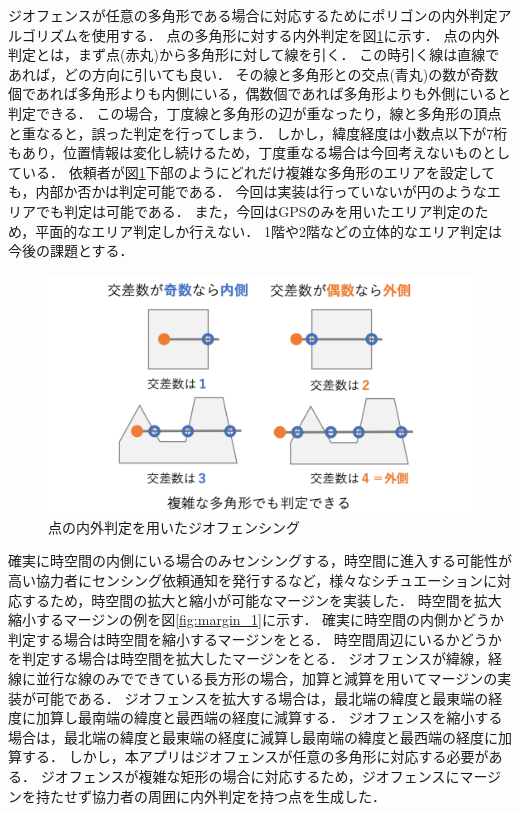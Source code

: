 ジオフェンスが任意の多角形である場合に対応するためにポリゴンの内外判定アルゴリズム\cite{naigai}を使用する．
点の多角形に対する内外判定を図\ref{fig:polygon_2}に示す．
点の内外判定とは，まず点(赤丸)から多角形に対して線を引く．
この時引く線は直線であれば，どの方向に引いても良い．
その線と多角形との交点(青丸)の数が奇数個であれば多角形よりも内側にいる，偶数個であれば多角形よりも外側にいると判定できる．
この場合，丁度線と多角形の辺が重なったり，線と多角形の頂点と重なると，誤った判定を行ってしまう．
しかし，緯度経度は小数点以下が7桁もあり，位置情報は変化し続けるため，丁度重なる場合は今回考えないものとしている．
依頼者が図\ref{fig:polygon_2}下部のようにどれだけ複雑な多角形のエリアを設定しても，内部か否かは判定可能である．
今回は実装は行っていないが円のようなエリアでも判定は可能である．
また，今回はGPSのみを用いたエリア判定のため，平面的なエリア判定しか行えない．
1階や2階などの立体的なエリア判定は今後の課題とする．

\begin{figure}[tbh]
    \centering
    \includegraphics[width=16cm]{img_polygon_2.png}
    \caption{点の内外判定を用いたジオフェンシング}
    \label{fig:polygon_2}
\end{figure}

確実に時空間の内側にいる場合のみセンシングする，時空間に進入する可能性が高い協力者にセンシング依頼通知を発行するなど，様々なシチュエーションに対応するため，時空間の拡大と縮小が可能なマージンを実装した．
時空間を拡大縮小するマージンの例を図\ref{fig:margin_1}に示す．
確実に時空間の内側かどうか判定する場合は時空間を縮小するマージンをとる．
時空間周辺にいるかどうかを判定する場合は時空間を拡大したマージンをとる．
ジオフェンスが緯線，経線に並行な線のみでできている長方形の場合，加算と減算を用いてマージンの実装が可能である．
ジオフェンスを拡大する場合は，最北端の緯度と最東端の経度に加算し最南端の緯度と最西端の経度に減算する．
ジオフェンスを縮小する場合は，最北端の緯度と最東端の経度に減算し最南端の緯度と最西端の経度に加算する．
しかし，本アプリはジオフェンスが任意の多角形に対応する必要がある．
ジオフェンスが複雑な矩形の場合に対応するため，ジオフェンスにマージンを持たせず協力者の周囲に内外判定を持つ点を生成した．

